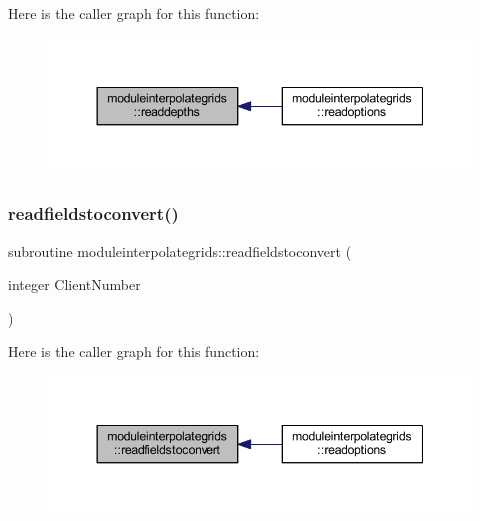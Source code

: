 Here is the caller graph for this function\+:\nopagebreak
\begin{figure}[H]
\begin{center}
\leavevmode
\includegraphics[width=344pt]{namespacemoduleinterpolategrids_a4e19db7f9940572fb986010ea9d64ec3_icgraph}
\end{center}
\end{figure}
\mbox{\label{namespacemoduleinterpolategrids_a1125f9b09e9502ada7dcfc306f876aac}} 
\subsubsection{\texorpdfstring{readfieldstoconvert()}{readfieldstoconvert()}}
{\footnotesize\ttfamily subroutine moduleinterpolategrids\+::readfieldstoconvert (\begin{DoxyParamCaption}\item[{integer}]{Client\+Number }\end{DoxyParamCaption})\hspace{0.3cm}{\ttfamily [private]}}

Here is the caller graph for this function\+:\nopagebreak
\begin{figure}[H]
\begin{center}
\leavevmode
\includegraphics[width=344pt]{namespacemoduleinterpolategrids_a1125f9b09e9502ada7dcfc306f876aac_icgraph}
\end{center}
\end{figure}
\mbox{\label{namespacemoduleinterpolategrids_a18ff5c4dd12a7c5ee25d5ceaf91fd501}} 
